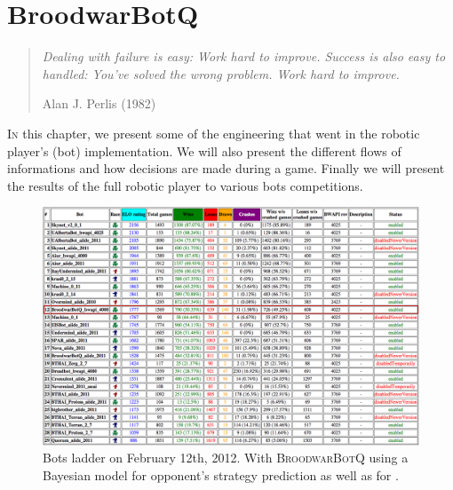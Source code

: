 \chapter{BroodwarBotQ}%
\label{chapter:bot}



\begin{quotation}
\textit{Dealing with failure is easy: Work hard to improve. Success is also easy to handled: You've solved the wrong problem. Work hard to improve.}\\
\begin{flushright}Alan J. Perlis (1982)\end{flushright}
\end{quotation}

\lettrine{I}{n} this chapter, we present some of the engineering that went in the robotic player's (bot) implementation. We will also present the different flows of informations and how decisions are made during a game. Finally we will present the results of the full robotic player to various bots competitions.


\begin{figure}
\includegraphics[width=1.0\columnwidth]{images/ladder_2012-02-12.png}
\caption{Bots ladder on February 12th, 2012. With \textsc{BroodwarBotQ} using a Bayesian model for opponent's strategy prediction as well as for .}
\end{figure}


